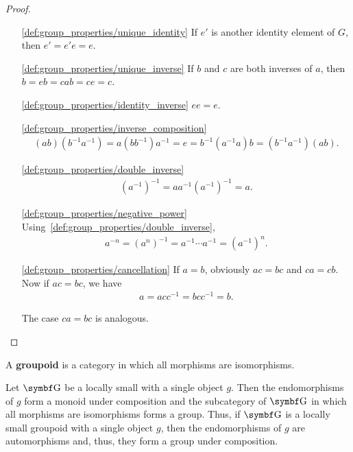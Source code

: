 \begin{proof}\mbox{}
  \begin{itemize}
    \item[\ref{def:group_properties/unique_identity}] If \( e' \) is another identity element of \( G \), then \( e' = e' e = e \).
    \item[\ref{def:group_properties/unique_inverse}] If \( b \) and \( c \) are both inverses of \( a \), then \( b = eb = cab = ce = c \).
    \item[\ref{def:group_properties/identity_inverse}] \( ee = e \).
    \item[\ref{def:group_properties/inverse_composition}]
    \begin{align*}
      (ab) (b^{-1} a^{-1})
      =
      a (b b^{-1}) a^{-1}
      =
      e
      =
      b^{-1} (a^{-1} a) b
      =
      (b^{-1} a^{-1}) (ab).
    \end{align*}

    \item[\ref{def:group_properties/double_inverse}]
    \begin{align*}
      (a^{-1})^{-1}
      =
      a a^{-1} (a^{-1})^{-1}
      =
      a.
    \end{align*}

    \item[\ref{def:group_properties/negative_power}] Using~\ref{def:group_properties/double_inverse},
    \begin{align*}
      a^{-n}
      =
      (a^n)^{-1}
      =
      a^{-1} \cdots a^{-1}
      =
      (a^{-1})^n.
    \end{align*}

    \item[\ref{def:group_properties/cancellation}] If \( a = b \), obviously \( ac = bc \) and \( ca = cb \). Now if \( ac = bc \), we have
    \begin{align*}
      a = acc^{-1} = bcc^{-1} = b.
    \end{align*}

    The case \( ca = bc \) is analogous.
  \end{itemize}
\end{proof}

\begin{definition}\label{def:groupoid}
  A \textbf{groupoid} is a category in which all morphisms are isomorphisms.
\end{definition}

\begin{definition}\label{note:groupoids}
  Let \( \Bold G \) be a locally small with a single object \( g \). Then the endomorphisms of \( g \) form a monoid under composition and the subcategory of \( \Bold G \) in which all morphisms are isomorphisms forms a group. Thus, if \( \Bold G \) is a locally small groupoid with a single object \( g \), then the endomorphisms of \( g \) are automorphisms and, thus, they form a group under composition.
\end{definition}

